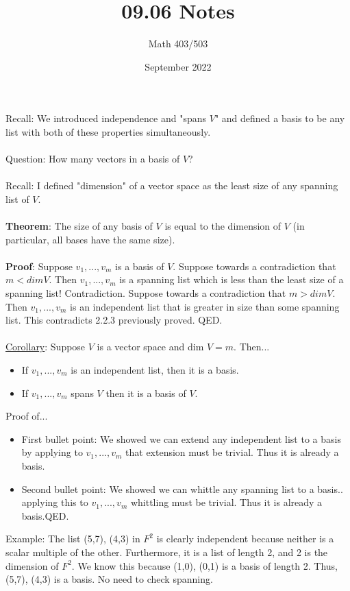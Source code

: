\documentclass{article}
\title{09.06 Notes}
\author{Math 403/503 }
\date{September 2022}
\begin{document}
\maketitle

Recall: We introduced independence and "spans $V$" and defined a basis to be any list with both of these properties simultaneously. \\\\
Question: How many vectors in a basis of $V$? \\ \\
Recall: I defined "dimension" of a vector space as the least size of any spanning list of $V$. \\ \\
\textbf{Theorem}: The size of any basis of $V$ is equal to the dimension of $V$ (in particular, all bases have the same size). \\\\
\textbf{Proof}: Suppose $v_1, ..., v_m$ is a basis of $V$. Suppose towards a contradiction that $m < dim V$. Then $v_1, ..., v_m$ is a spanning list which is less than the least size of a spanning list! Contradiction. Suppose towards a contradiction that $m > dim V$. Then $v_1, ..., v_m$ is an independent list that is greater in size than some spanning list. This contradicts 2.2.3 previously proved. QED. \\\\
\underline{Corollary}: Suppose $V$ is a vector space  and dim $V = m$. Then... \begin{itemize}
\item If $v_1, ..., v_m$ is an independent list, then it is a basis. 
\item If $v_1, ..., v_m$ spans $V$ then it is a basis of $V$. 
\end{itemize}

Proof of... \begin{itemize}
    \item First bullet point: We showed we can extend any independent list to a basis by applying to $v_1, ..., v_m$ that extension must be trivial. Thus it is already a basis. 
    \item Second bullet point: We showed we can whittle any spanning list to a basis.. applying this to $v_1, ..., v_m$ whittling must be trivial. Thus it is already a basis.QED. 
\end{itemize} 

Example: The list (5,7), (4,3) in $F^2$ is clearly independent because neither is a scalar multiple of the other. Furthermore, it is a list of length 2, and 2 is the dimension of $F^2$. We know this because (1,0), (0,1) is a basis of length 2. Thus, (5,7), (4,3) is a basis. No need to check spanning. \\
\end{document}
